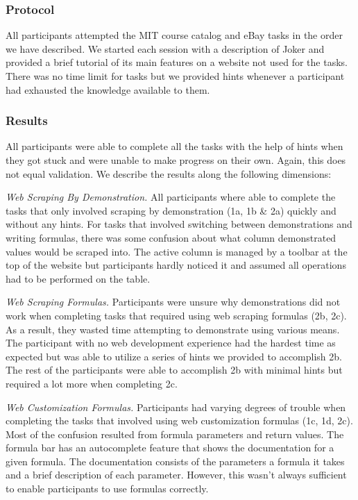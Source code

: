 \documentclass[sigconf,10pt]{acmart}
\begin{document}
\hypertarget{protocol}{%
\subsubsection{Protocol}\label{protocol}}

All participants attempted the MIT course catalog and eBay tasks in the
order we have described. We started each session with a description of
Joker and provided a brief tutorial of its main features on a website
not used for the tasks. There was no time limit for tasks but we
provided hints whenever a participant had exhausted the knowledge
available to them.

\hypertarget{results}{%
\subsubsection{Results}\label{results}}

All participants were able to complete all the tasks with the help of
hints when they got stuck and were unable to make progress on their own.
Again, this does not equal validation. We describe the results along the
following dimensions:

\emph{Web Scraping By Demonstration.} All participants where able to
complete the tasks that only involved scraping by demonstration (1a, 1b
\& 2a) quickly and without any hints. For tasks that involved switching
between demonstrations and writing formulas, there was some confusion
about what column demonstrated values would be scraped into. The active
column is managed by a toolbar at the top of the website but
participants hardly noticed it and assumed all operations had to be
performed on the table.

\emph{Web Scraping Formulas.} Participants were unsure why
demonstrations did not work when completing tasks that required using
web scraping formulas (2b, 2c). As a result, they wasted time attempting
to demonstrate using various means. The participant with no web
development experience had the hardest time as expected but was able to
utilize a series of hints we provided to accomplish 2b. The rest of the
participants were able to accomplish 2b with minimal hints but required
a lot more when completing 2c.

\emph{Web Customization Formulas.} Participants had varying degrees of
trouble when completing the tasks that involved using web customization
formulas (1c, 1d, 2c). Most of the confusion resulted from formula
parameters and return values. The formula bar has an autocomplete
feature that shows the documentation for a given formula. The
documentation consists of the parameters a formula it takes and a brief
description of each parameter. However, this wasn't always sufficient to
enable participants to use formulas correctly.
\end{document}
